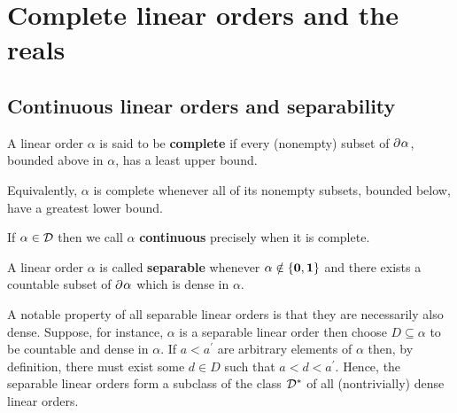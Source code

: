 
\chapter{Complete linear orders and the reals}

\section{Continuous linear orders and separability}

\begin{dfn}[Completeness]
	A linear order $\alpha$ is said to be \textbf{complete} if every (nonempty)
	subset of $\partial^{}{\alpha}$, bounded above in $\alpha$, has a least upper
	bound.
\end{dfn}

Equivalently, $\alpha$ is complete whenever all of its nonempty subsets, bounded
below, have a greatest lower bound.

\begin{dfn}
	If $\alpha\in\mathcal{D}$ then we call $\alpha$ \textbf{continuous} precisely when it is complete.
\end{dfn}

\begin{dfn}[Separable]
	A linear order $\alpha$ is called \textbf{separable} whenever
	$\alpha\notin\left\lbrace \mathbf{0},\mathbf{1}\right\rbrace$ and there exists a countable subset of
	$\partial^{}{}\alpha$ which is dense in $\alpha$.
\end{dfn}

A notable property of all separable linear orders is that they are necessarily
also dense.  Suppose, for instance, $\alpha$ is a separable linear order then
choose $D\subseteq\alpha$ to be countable and dense in $\alpha$.  If
$a<a^{\prime}$ are arbitrary elements of $\alpha$ then, by definition, there
must exist some $d\in D$ such that $a<d<a^{\prime}$.  Hence, the separable
linear orders form a subclass of the class $\mathcal{D}^\ast$ of all (nontrivially) dense
linear orders.

